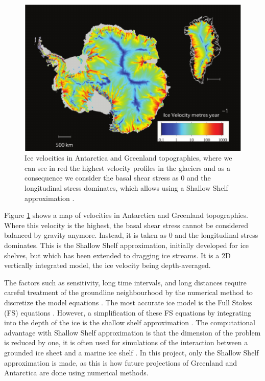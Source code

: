 \documentclass{article}
\begin{document}
\begin{figure}[!h]
	\centering
	\includegraphics[width=0.7\linewidth]{../fig/velocityglaciar.png}
	\caption{Ice velocities in Antarctica and Greenland topographies, where we can see in red the highest velocity profiles in the glaciers and as a consequence we consider the basal shear stress as 0 and the longitudinal stress dominates, which allows using a Shallow Shelf approximation \cite[]{allison2009ice}.}
	\label{velocityglaciar}
\end{figure}
Figure \ref{velocityglaciar} shows a map of velocities in Antarctica and Greenland topographies. Where this velocity is the highest, the basal shear stress cannot be considered balanced by gravity anymore. Instead, it is taken as 0 and the longitudinal stress dominates. This is the Shallow Shelf approximation, initially developed for ice shelves, but which has been extended to dragging ice streams. It is a 2D vertically integrated model, the ice velocity being depth-averaged.

The factors such as sensitivity, long time intervals, and long distances require careful treatment of the groundline neighbourhood by the numerical method to discretize the model equations \cite[]{cheng2019full}. The most accurate ice model is the Full Stokes (FS) equations \cite[]{cheng2019full}. However, a simplification of these FS equations by integrating into the depth of the ice is the shallow shelf approximation \cite[]{macayeal1989large}. The computational advantage with Shallow Shelf approximation is that the dimension of the problem is reduced by one, it is often used for simulations of the interaction between a grounded ice sheet and a marine ice shelf \cite[]{cheng2019full}. 
In this project, only the Shallow Shelf approximation is made, as this is how future projections of Greenland and Antarctica are done using numerical methods.
\end{document}

